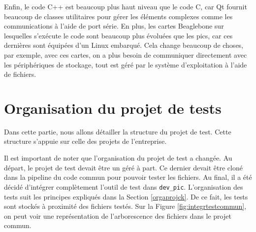 \documentclass[a4paper]{article}
\begin{document}
Enfin, le code C++ est beaucoup plus haut niveau que le code C, car Qt fournit
beaucoup de classes utilitaires pour gérer les éléments complexes comme les
communications à l'aide de port série. En plus, les cartes Beaglebone sur
lesquelles s'exécute le code sont beaucoup plus évoluées que les \gls{pic}s, car
ces dernières sont équipées d'un Linux embarqué. Cela change beaucoup de choses,
par exemple, avec ces cartes, on a plus besoin de communiquer directement avec
les périphériques de stockage, tout est géré par le système d'exploitation à
l'aide de fichiers.
\section{Organisation du projet de tests}%

Dans cette partie, nous allons détailler la structure du projet de test. Cette
structure s'appuie sur celle des projets de l'entreprise.

Il est important de noter que l'organisation du projet de test a changée. Au
départ, le projet de test devait être un géré à part. Ce dernier devait être
cloné dans la pipeline du code commun pour pouvoir tester les fichiers. Au
final, il a été décidé d'intégrer complètement l'outil de test dans
\verb|dev_pic|. L'organisation des tests suit les principes expliqués dans la
Section \ref{orgaprojck}. De ce fait, les tests sont stockés à proximité des
fichiers testés. Sur la Figure \ref{fig:integrtestcommun}, on peut voir une
représentation de l'arborescence des fichiers dans le projet commun.
\end{document}
